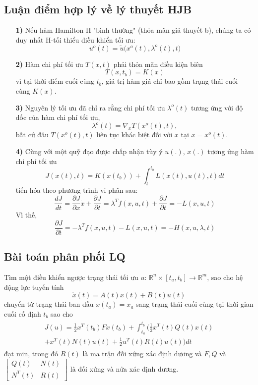 \documentclass[11pt]{beamer}
\begin{document}
\subsection{Luận điểm hợp lý về lý thuyết HJB}
\begin{frame}
	\begin{enumerate}
		\item [\textbf{1)}] Nếu hàm Hamilton H "bình thường"   (thỏa mãn giả thuyết b), chúng ta có duy nhất
		H-tối thiểu điều khiển tối ưu: $$u^o(t) = \tilde{u}\big(x^o(t), \lambda^o(t), t\big)$$ 
		\item [\textbf{2)}] Hàm chi phí tối ưu $T(x, t)$ phải thỏa mãn điều kiện biên $$T(x, t_b) = K(x)$$ vì tại thời điểm cuối cùng $t_b$, giá trị hàm giá chỉ bao gồm trạng thái cuối cùng $K(x)$.\item[\textbf{3)}] Nguyên lý tối ưu đã chỉ ra rằng chi phí tối ưu $\lambda^o(t)$ tương ứng với độ dốc của hàm chi phí tối ưu, $$\lambda^o(t) = \nabla_xT(x^o(t),t), $$ bất cứ đâu $T(x^o(t), t)$ liên tục khác biệt đối với $x$ tại $x = x^o(t)$.
	\end{enumerate}
\end{frame}

\begin{frame}
\begin{enumerate}
	\item [\textbf{4)}] Cùng với một quỹ đạo được chấp nhận tùy ý $u(.)$, $x(.)$ tương ứng
	hàm chi phí tối ưu $$J(x(t), t) = K(x(t_b)) + \int_{t}^{t_b}L(x(t), u(t), t)dt$$ tiến hóa theo phương trình vi phân sau: $$\frac{dJ}{dt} = \frac{\partial J}{\partial x}\dot{x} + \frac{\partial J}{\partial t} = \lambda^Tf(x, u, t) + \frac{\partial J}{\partial t} = -L(x, u, t)$$ Vì thế, $$\frac{\partial J}{\partial t} = -\lambda^Tf(x, u, t) - L(x, u, t) = -H(x, u, \lambda, t)$$
\end{enumerate}
\end{frame}

\subsection{Bài toán phân phối LQ}
\begin{frame}
	Tìm một điều khiển ngược trạng thái tối ưu $u$: $\mathbb{R}^n \times [t_a, t_b] \to \mathbb{R}^m$, sao cho hệ động lực tuyến tính $$\dot{x}(t)=A(t)x(t) + B(t)u(t)$$ chuyển từ trạng thái ban đầu $x(t_a) = x_a$ sang trạng thái cuối cùng tại thời gian cuối cố định $t_b$ sao cho
	\begin{eqnarray}
	\begin{split}
		J(u) =  \frac{1}{2}x^T(t_b)Fx(t_b) + \int_{t_a}^{t_b}\Big(\frac{1}{2}x^T(t)Q(t)x(t) \\ + x^T(t)N(t)u(t) + \frac{1}{2}u^T(t)R(t)u(t)\Big)dt
	\end{split}
 \nonumber
	\end{eqnarray} đạt min, trong đó $R(t)$ là ma trận đối xứng xác định dương và $F, Q$ và $\begin{bmatrix}
	Q(t)&N(t)\\N^T(t)&R(t)
	\end{bmatrix}$ là đối xứng và nửa xác định dương.
\end{frame}
\end{document}
